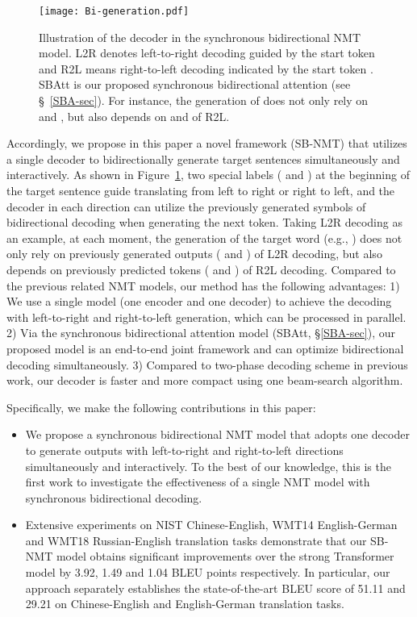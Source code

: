 \documentclass[11pt,a4paper]{article}
\begin{document}
\begin{CJK*}{UTF8}{gbsn}
\begin{figure}
    \centering
    \texttt{[image: Bi-generation.pdf]}
    \caption{Illustration of the decoder in the synchronous bidirectional NMT model. L2R denotes left-to-right decoding guided by the start token  and R2L means right-to-left decoding indicated by the start token .
    SBAtt is our proposed synchronous bidirectional attention (see \S~\ref{SBA-sec}).
    For instance, the generation of  does not only rely on  and , but also depends on  and  of R2L.
    }\label{Bi-generation}
\end{figure}

Accordingly, we propose in this paper a novel framework (SB-NMT) that utilizes a single decoder to bidirectionally generate target sentences simultaneously and interactively.
As shown in Figure~\ref{Bi-generation}, two special labels ( and ) at the beginning of the target sentence guide translating from left to right or right to left, and the decoder in each direction can utilize the previously generated symbols of bidirectional decoding when generating the next token.
Taking L2R decoding as an example, at each moment, the generation of the target word (e.g., ) does not only rely on previously generated outputs ( and ) of L2R decoding, but also depends on previously predicted tokens ( and ) of R2L decoding. Compared to the previous related NMT models, our method has the following advantages:
1) We use a single model (one encoder and one decoder) to achieve the decoding with left-to-right and right-to-left generation, which can be processed in parallel.
2) Via the synchronous bidirectional attention model (SBAtt, \S\ref{SBA-sec}), our proposed model is an end-to-end joint framework and can optimize bidirectional decoding simultaneously.
3) Compared to two-phase decoding scheme in previous work, our decoder is faster and more compact using one beam-search algorithm.

Specifically, we make the following contributions in this paper:
\begin{itemize}
\item We propose a synchronous bidirectional NMT model that adopts one decoder to generate outputs with left-to-right and right-to-left directions simultaneously and interactively.
To the best of our knowledge, this is the first work to investigate the effectiveness of a single NMT model with synchronous bidirectional decoding.
\item Extensive experiments on NIST Chinese-English, WMT14 English-German and WMT18 Russian-English translation tasks demonstrate that our SB-NMT model obtains significant improvements over the strong Transformer model by 3.92, 1.49 and 1.04 BLEU points respectively.
In particular, our approach separately establishes the state-of-the-art BLEU score of 51.11 and 29.21 on Chinese-English and English-German translation tasks.
\end{itemize}


\end{CJK*}
\end{document}
